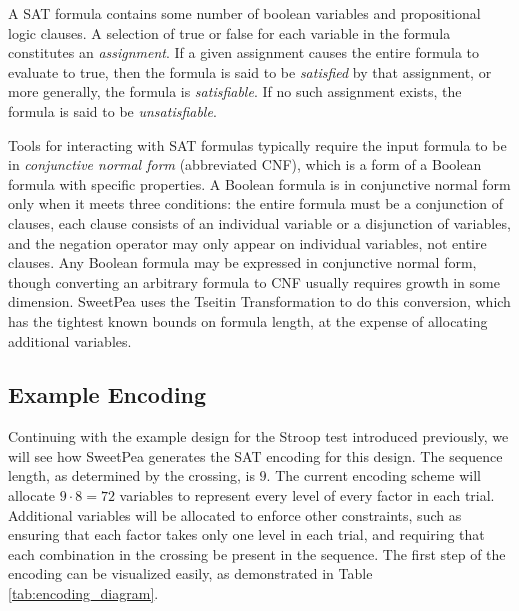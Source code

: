 A SAT formula contains some number of boolean variables and propositional logic clauses. A selection of true or false for each variable in the formula constitutes an \textit{assignment}. If a given assignment causes the entire formula to evaluate to true, then the formula is said to be \textit{satisfied} by that assignment, or more generally, the formula is \textit{satisfiable}. If no such assignment exists, the formula is said to be \textit{unsatisfiable}.

Tools for interacting with SAT formulas typically require the input formula to be in \textit{conjunctive normal form} (abbreviated CNF), which is a form of a Boolean formula with specific properties. A Boolean formula is in conjunctive normal form only when it meets three conditions: the entire formula must be a conjunction of clauses, each clause consists of an individual variable or a disjunction of variables, and the negation operator may only appear on individual variables, not entire clauses. Any Boolean formula may be expressed in conjunctive normal form, though converting an arbitrary formula to CNF usually requires growth in some dimension. SweetPea uses the Tseitin Transformation \cite{tseitin1983complexity} to do this conversion, which has the tightest known bounds on formula length, at the expense of allocating additional variables.

\subsection{Example Encoding}

Continuing with the example design for the Stroop test introduced previously, we will see how SweetPea generates the SAT encoding for this design. The sequence length, as determined by the crossing, is $9$. The current encoding scheme will allocate $9 \cdot 8 = 72$ variables to represent every level of every factor in each trial. Additional variables will be allocated to enforce other constraints, such as ensuring that each factor takes only one level in each trial, and requiring that each combination in the crossing be present in the sequence. The first step of the encoding can be visualized easily, as demonstrated in Table \ref{tab:encoding_diagram}.

